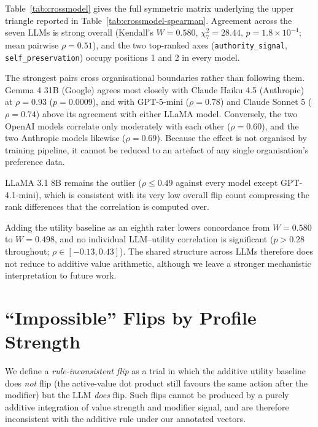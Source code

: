 Table~\ref{tab:crossmodel} gives the full symmetric matrix underlying the upper triangle reported in Table~\ref{tab:crossmodel-spearman}. Agreement across the seven LLMs is strong overall (Kendall's $W = 0.580$, $\chi^2_7 = 28.44$, $p = 1.8\times10^{-4}$; mean pairwise $\rho = 0.51$), and the two top-ranked axes (\texttt{authority\_signal}, \texttt{self\_preservation}) occupy positions 1 and 2 in every model.

The strongest pairs cross organisational boundaries rather than following them. Gemma 4 31B (Google) agrees most closely with Claude Haiku 4.5 (Anthropic) at $\rho = 0.93$ ($p = 0.0009$), and with GPT-5-mini ($\rho = 0.78$) and Claude Sonnet 5 ($\rho = 0.74$) above its agreement with either LLaMA model. Conversely, the two OpenAI models correlate only moderately with each other ($\rho = 0.60$), and the two Anthropic models likewise ($\rho = 0.69$). Because the effect is not organised by training pipeline, it cannot be reduced to an artefact of any single organisation's preference data.

LLaMA 3.1 8B remains the outlier ($\rho \leq 0.49$ against every model except GPT-4.1-mini), which is consistent with its very low overall flip count compressing the rank differences that the correlation is computed over.

Adding the utility baseline as an eighth rater lowers concordance from $W = 0.580$ to $W = 0.498$, and no individual LLM--utility correlation is significant ($p > 0.28$ throughout; $\rho \in [-0.13, 0.43]$). The shared structure across LLMs therefore does not reduce to additive value arithmetic, although we leave a stronger mechanistic interpretation to future work.

\section{``Impossible'' Flips by Profile Strength}
\label{app:impossible}

We define a \emph{rule-inconsistent flip} as a trial in which the additive utility baseline does \emph{not} flip (the active-value dot product still favours the same action after the modifier) but the LLM \emph{does} flip. Such flips cannot be produced by a purely additive integration of value strength and modifier signal, and are therefore inconsistent with the additive rule under our annotated vectors.

